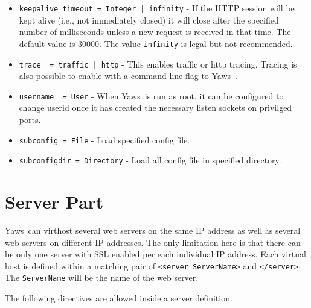 \documentclass[11pt,oneside,english]{book}
\newcommand{\Yaws}            %
        {{\sc Yaws}}
\begin{document}
\begin{itemize}
\item        \verb+keepalive_timeout = Integer | infinity+ -
              If the HTTP session will be kept alive (i.e., not
              immediately closed) it will close after the specified
              number of milliseconds unless a new request is received
              in that time. The default value is 30000. The value
              \verb+infinity+ is legal but not recommended.

\item        \verb+trace  = traffic | http+ -
              This  enables  traffic  or http tracing. Tracing is
              also possible to enable with a command line flag to
              \Yaws\ .

\item        \verb+username  = User+ -
             When \Yaws\  is run as root, it can be configured to
             change userid once it has created the necessary
             listen sockets on privilged ports.

\item        \verb+subconfig = File+ -
             Load specified config file.

\item        \verb+subconfigdir = Directory+ -
             Load all config file in specified directory.

\end{itemize}



\section{Server Part}

\Yaws\ can virthost several web servers on the same IP address as well
as several web servers on different IP addresses.  The only limitation
here is that there can be only one server with SSL enabled per each
individual IP address.  Each virtual host is defined within a matching
pair of \verb+<server ServerName>+ and \verb+</server>+.  The
\verb+ServerName+ will be the name of the web server.

The following directives are allowed inside a server definition.
\end{document}
